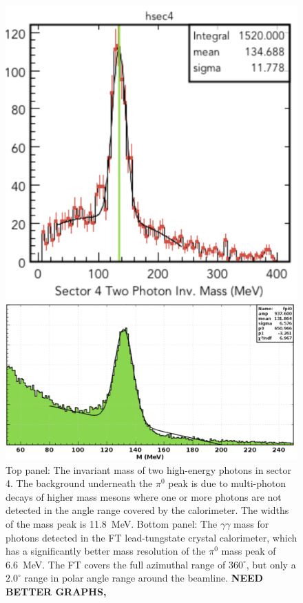 \documentclass[final,3p,times,twocolumn,authoryear]{elsarticle}
\begin{document}
\begin{figure}[htbp!]
\centerline{\includegraphics[width=0.95\columnwidth]{pi0.png}}
\centerline{\includegraphics[width=0.9\columnwidth]{ft-pi0.png}}
\caption{Top panel: The invariant mass of two high-energy photons in sector 4. The background underneath the 
$\pi^0$ peak is due to multi-photon decays of higher mass mesons where one or more photons 
are not detected in the angle range covered by the calorimeter. The widths of the mass peak is 11.8~MeV. 
Bottom panel: The $\gamma\gamma$ mass for photons detected in the FT lead-tungstate crystal calorimeter, which 
has a significantly better mass resolution of the $\pi^0$ mass peak of 6.6~MeV. The FT covers the full azimuthal range of $360^\circ$, 
but only a $2.0^\circ$ range in polar angle range around the beamline.  
{\bf NEED BETTER GRAPHS, }} 
\label{gg}
\end{figure} 
\end{document}
